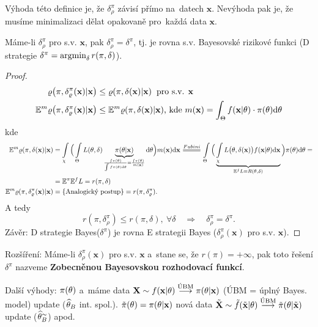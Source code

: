 \begin{remark}
	Výhoda této definice je, že $\delta_\rho^\pi$ závisí přímo na~datech $\textbf{x}$. Nevýhoda pak je, že musíme minimalizaci dělat opakovaně pro~každá data $\textbf{x}$.
\end{remark}
\begin{theorem}\label{veta_zamena}
	Máme-li $\delta_\rho^\pi$ pro s.v. $\textbf{x}$, pak $\delta_\rho^\pi=\delta^\pi$, tj. je rovna s.v. Bayesovské rizikové funkci (D strategie $\delta^\pi=\mathop{\mathrm{argmin}}_\delta r(\pi,\delta)$).
	\begin{proof}
		\[
		\begin{split}
		\varrho\big(\pi,\delta_\varrho^\pi(\textbf{x})|\textbf{x}\big)&\leq \varrho(\pi,\delta(\textbf{x})|\textbf{x}) \hspace{0.2cm} \text{pro s.v. } \textbf{x} \\
		\mathbb{E}^m\varrho\big(\pi,\delta_\varrho^\pi(\textbf{x})|\textbf{x}\big)&\leq \mathbb{E}^m\varrho(\pi,\delta(\textbf{x})|\textbf{x})\text{, kde } m(\textbf{x})=\int_{\Theta}f(\textbf{x}|\theta)\cdot \pi(\theta)\mathrm{d}\theta
		\end{split}
		\]
		kde
		\[
		\begin{split}
		\E^m\rho(\pi,\delta(\textbf{x})|\textbf{x})&=\int\limits_{\chi}\Big( \int\limits_{\Theta} L(\t,\delta)\underbrace{\pi(\t|\textbf{x})}_{\frac{f\pi(\t)}{\int f\pi(\t)\d\t}=\frac{f\pi(\t)}{m(\textbf{x})}}\d\t\Big)m(\textbf{x})\d\textbf{x}\equal{Fubini}\int\limits_{\Theta}\Big( \underbrace{\int\limits_{\chi} L\big(\t,\delta(\textbf{x})\big)f(\textbf{x}|\t)\d\textbf{x}}_{\E^f L=R(\t,\delta)} \Big)\pi(\t)\d\t=\\&=\E^\pi\E^f L=r(\pi,\delta) \\
		\E^m\rho(\pi,\delta_\rho^\pi(\textbf{x})|\textbf{x})&=\{\text{Analogický postup}\}=r(\pi,\delta_\rho^\pi).
		\end{split}
		\]
		A tedy 
		$$ r(\pi,\delta_\rho^\pi)\leq r(\pi,\delta),~\forall\delta\quad \Rightarrow\quad \delta_\rho^\pi=\delta^\pi.$$
		Závěr: D strategie Bayes($\delta^\pi$) je rovna E strategii Bayes ($\delta_\rho^\pi(\textbf{x})$ pro s.v. $\textbf{x}$).
	\end{proof} 
\end{theorem}
Rozšíření: Máme-li $\delta_\rho^\pi(\textbf{x})$ pro s.v. $\textbf{x}$ a~stane se, že $r(\pi)=+\infty$, pak toto řešení $\delta^{\pi}$ nazveme \textbf{Zobecněnou Bayesovskou rozhodovací funkcí}.

Další výhody: $\pi(\theta)$ a~máme data $\textbf{X}\sim f(\textbf{x}|\theta)\stackrel{\text{ÚBM}}{\longrightarrow}\pi(\theta|\textbf{x})$ (ÚBM = úplný Bayes. model) update ($\widehat{\theta}_B$ int. spol.). $\tilde{\pi}(\theta)=\pi(\theta|\textbf{x})$ nová data $\tilde{\textbf{X}}\sim\tilde{f}(\tilde{\textbf{x}}|\theta)\stackrel{\text{ÚBM}}{\longrightarrow}\tilde{\pi}(\theta|\tilde{\textbf{x}})$ update ($\widehat{\theta}_B^{\sim}$) apod. 

